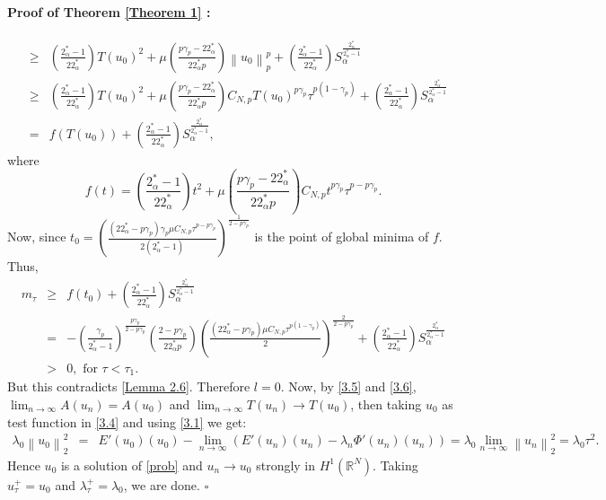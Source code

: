 \documentclass[11pt]{article}
\numberwithin{equation}{section}
\numberwithin{mytheorem}{section}
\newenvironment{myproof}[2] {\paragraph{Proof of {#1} {#2} :}}{\hfill$\square$}
\begin{document}
\begin{myproof}{Theorem}{\ref{Theorem 1}}
\begin{eqnarray*}
				& \geq & \left(\frac{2^*_{\alpha}-1}{22^*_{\alpha}}\right)T(u_0)^2+\mu\left(\frac{p\gamma_p-22^*_{\alpha}}{22^*_{\alpha}p}\right)\left\| u_0 \right\|_p^p+\left(\frac{2^*_{\alpha}-1}{22^*_{\alpha}}\right)S_{\alpha}^{\frac{2^*_{\alpha}}{2^*_{\alpha}-1}}\nonumber\\
				& \geq &\left(\frac{2^*_{\alpha}-1}{22^*_{\alpha}}\right)T(u_0)^2+\mu\left(\frac{p\gamma_p-22^*_{\alpha}}{22^*_{\alpha}p}\right)C_{N,p}T(u_0)^{p\gamma_p}\tau^{p(1-\gamma_p)}+ \left(\frac{2^*_{\alpha}-1}{22^*_{\alpha}}\right)S_{\alpha}^{\frac{2^*_{\alpha}}{2^*_{\alpha}-1}}\nonumber\\
				& = & f(T(u_0))+\left(\frac{2^*_{\alpha}-1}{22^*_{\alpha}}\right)S_{\alpha}^{\frac{2^*_{\alpha}}{2^*_{\alpha}-1}},
			\end{eqnarray*}
			where $$f(t)=\left(\frac{2^*_{\alpha}-1}{22^*_{\alpha}}\right)t^2+\mu\left(\frac{p\gamma_p-22^*_{\alpha}}{22^*_{\alpha}p}\right)C_{N,p}t^{p\gamma_p}\tau^{p-p\gamma_p}.$$
			Now, since $t_0=\left(\frac{(22^*_{\alpha}-p\gamma_p)\gamma_p\mu C_{N,p}\tau^{p-p\gamma_p}}{2(2^*_{\alpha}-1)}\right)^{\frac{1}{2-p\gamma_p}}$ is the point of global minima of $f$. Thus,
			\begin{eqnarray*}
				m_{\tau} & \geq & f(t_0)+\left(\frac{2^*_{\alpha}-1}{22^*_{\alpha}}\right)S_{\alpha}^{\frac{2^*_{\alpha}}{2^*_{\alpha}-1}}\\
				& = & -\left(\frac{\gamma_p}{2^*_{\alpha}-1}\right)^{\frac{p\gamma_p}{2-p\gamma_p}}\left(\frac{2-p\gamma_p}{22^*_{\alpha}p}\right)\left(\frac{(22^*_{\alpha}-p\gamma_p)\mu C_{N,p}\tau^{p(1-\gamma_p)}}{2}\right)^{\frac{2}{2-p\gamma_p}}+\left(\frac{2^*_{\alpha}-1}{22^*_{\alpha}}\right)S_{\alpha}^{\frac{2^*_{\alpha}}{2^*_{\alpha}-1}}\\
				& > &0, \text{ for } \tau<\tau_1.
			\end{eqnarray*}
			But this contradicts \autoref{Lemma 2.6}. Therefore $l=0$. Now, by \eqref{3.5} and \eqref{3.6},  $\displaystyle \lim_{n\rightarrow \infty}A(u_n)=A(u_0)$ and $\displaystyle \lim_{n\rightarrow \infty}T(u_n)\rightarrow T(u_0)$, then taking $u_0$ as test function in \eqref{3.4} and using \eqref{3.1} we get:
			\begin{eqnarray*}
				\lambda_0\left\| u_0 \right\|_2^2 & = & E'(u_0)(u_0)-\lim_{n\rightarrow \infty}\left(E'(u_n)(u_n)-\lambda_n\Phi'(u_n)(u_n)\right)= \lambda_0\lim_{n\rightarrow \infty}\left\| u_n \right\|_2^2=\lambda_0 \tau^2.
			\end{eqnarray*}
			Hence $u_0$ is a solution of \eqref{prob} and $u_n\rightarrow u_0$ strongly in $H^1(\mathbb{R}^N)$. Taking $u_{\tau}^+=u_0$ and $\lambda_{\tau}^+=\lambda_0$, we are done.
		\end{myproof}
\end{document}
